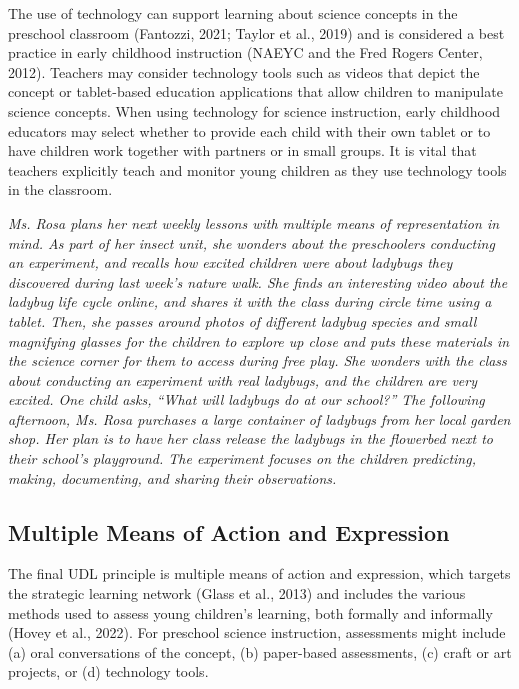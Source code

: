 \documentclass[11.5pt]{sig-alternate}
\begin{document}
\begin{large}
The use of technology can support learning about science concepts in the preschool classroom (Fantozzi, 2021; Taylor et al., 2019) and is considered a best practice in early childhood instruction (NAEYC and the Fred Rogers Center, 2012). Teachers may consider technology tools such as videos that depict the concept or tablet-based education applications that allow children to manipulate science concepts. When using technology for science instruction, early childhood educators may select whether to provide each child with their own tablet or to have children work together with partners or in small groups. It is vital that teachers explicitly teach and monitor young children as they use technology tools in the classroom.

\emph {Ms. Rosa plans her next weekly lessons with multiple means of representation in mind. As part of her insect unit, she wonders about the preschoolers conducting an experiment, and recalls how excited children were about ladybugs they discovered during last week’s nature walk. She finds an interesting video about the ladybug life cycle online, and shares it with the class during circle time using a tablet. Then, she passes around photos of different ladybug species and small magnifying glasses for the children to explore up close and puts these materials in the science corner for them to access during free play.  She wonders with the class about conducting an experiment with real ladybugs, and the children are very excited. One child asks, “What will ladybugs do at our school?” The following afternoon, Ms. Rosa purchases a large container of ladybugs from her local garden shop. Her plan is to have her class release the ladybugs in the flowerbed next to their school’s playground. The experiment focuses on the children predicting, making, documenting, and sharing their observations.}

\subsection*{Multiple Means of Action and Expression}
 
The final UDL principle is multiple means of action and expression, which targets the strategic learning network (Glass et al., 2013) and includes the various methods used to assess young children’s learning, both formally and informally (Hovey et al., 2022). For preschool science instruction, assessments might include (a) oral conversations of the concept, (b) paper-based assessments, (c) craft or art projects, or (d) technology tools.   


\end{large}
\end{document}
